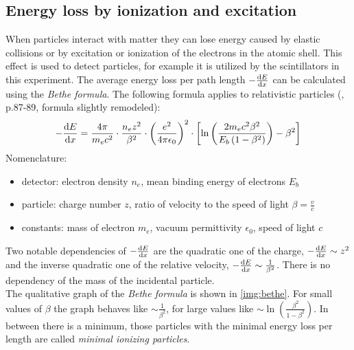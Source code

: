\subsection{Energy loss by ionization and excitation}
When particles interact with matter they can lose energy caused by elastic collisions or by excitation or ionization of the electrons in the 
atomic shell. This effect is used to detect particles, for example it is utilized by the scintillators in this experiment. The average energy loss per path length 
$-\frac{\mathrm{d} E}{\mathrm{d} x}$ can be calculated using the \emph{Bethe formula}. The following formula applies to relativistic particles (\cite{dem4}, p.87-89, formula slightly remodeled):
\begin{equation}
    - \frac{\mathrm{d} E}{\mathrm{d} x} = \frac{4 \pi}{m_e c^2} \cdot \frac{n_e z^2}{\beta^2} \cdot \left( \frac{e^2}{4 \pi \epsilon_0} \right)^2 \cdot \left[ \ln \left( \frac{2 m_e c^2 \beta^2}{E_b \left( 1-\beta^2 \right)  } \right) - \beta^2 \right]
\end{equation}
Nomenclature: 
\begin{itemize}
  \item detector: electron density $n_e$, mean binding energy of electrons $E_b$
  \item particle: charge number $z$, ratio of velocity to the speed of light $\beta = \frac{v}{c}$
  \item constants: mass of electron $m_e$, vacuum permittivity $\epsilon_0$, speed of light $c$
\end{itemize}
Two notable dependencies of $-\frac{\mathrm{d} E}{\mathrm{d} x}$ are the quadratic one of the charge, $-\frac{\mathrm{d} E}{\mathrm{d} x} \sim z^2$ and the inverse 
quadratic one of the relative velocity, $-\frac{\mathrm{d} E}{\mathrm{d} x} \sim \frac{1}{\beta^2}$. There is no dependency of the mass of the incidental 
particle.\\
The qualitative graph of the \emph{Bethe formula} is shown in \autoref{img:bethe}. 
For small values of $\beta$ the graph behaves like $\sim \frac{1}{\beta^2}$, for large values like 
$\sim \ln \left( \frac{\beta^2}{1-\beta^2} \right)$. In between there is a minimum, those particles with the minimal energy loss per length are called 
\emph{minimal ionizing particles}.
